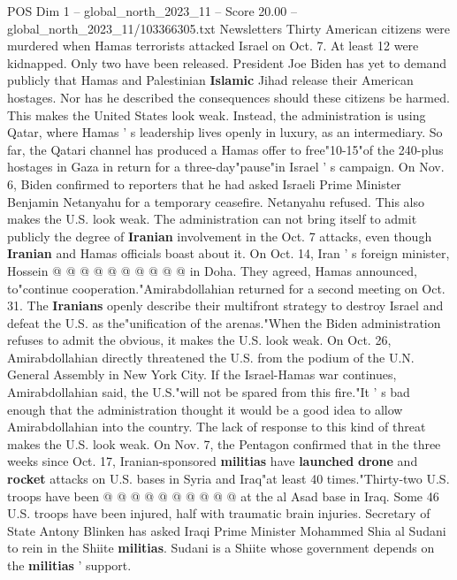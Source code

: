\begin{textsample}{POS Dim 1 – global\_north\_2023\_11 – Score 20.00 – global\_north\_2023\_11/103366305.txt}  \label{ex:f1_pos_352}
Newsletters Thirty American citizens were murdered when Hamas terrorists attacked Israel on Oct. 7.
At least 12 were kidnapped.
Only two have been released.
President Joe Biden has yet to demand publicly that Hamas and Palestinian \textbf{Islamic} Jihad release their American hostages.
Nor has he described the consequences should these citizens be harmed.
This makes the United States look weak.
Instead, the administration is using Qatar, where Hamas ' s leadership lives openly in luxury, as an intermediary.
So far, the Qatari channel has produced a Hamas offer to free"10-15"of the 240-plus hostages in Gaza in return for a three-day"pause"in Israel ' s campaign.
On Nov. 6, Biden confirmed to reporters that he had asked Israeli Prime Minister Benjamin Netanyahu for a temporary ceasefire.
Netanyahu refused.
This also makes the U.S. look weak.
The administration can not bring itself to admit publicly the degree of \textbf{Iranian} involvement in the Oct. 7 attacks, even though \textbf{Iranian} and Hamas officials boast about it.
On Oct. 14, Iran ' s foreign minister, Hossein @ @ @ @ @ @ @ @ @ @ in Doha.
They agreed, Hamas announced, to"continue cooperation."Amirabdollahian returned for a second meeting on Oct. 31.
The \textbf{Iranians} openly describe their multifront strategy to destroy Israel and defeat the U.S. as the"unification of the arenas."When the Biden administration refuses to admit the obvious, it makes the U.S. look weak.
On Oct. 26, Amirabdollahian directly threatened the U.S. from the podium of the U.N.
General Assembly in New York City.
If the Israel-Hamas war continues, Amirabdollahian said, the U.S."will not be spared from this fire."It ' s bad enough that the administration thought it would be a good idea to allow Amirabdollahian into the country.
The lack of response to this kind of threat makes the U.S. look weak.
On Nov. 7, the Pentagon confirmed that in the three weeks since Oct. 17, Iranian-sponsored \textbf{militias} have \textbf{launched} \textbf{drone} and \textbf{rocket} attacks on U.S. bases in Syria and Iraq"at least 40 times."Thirty-two U.S. troops have been @ @ @ @ @ @ @ @ @ @ at the al Asad base in Iraq.
Some 46 U.S. troops have been injured, half with traumatic brain injuries.
Secretary of State Antony Blinken has asked Iraqi Prime Minister Mohammed Shia al Sudani to rein in the Shiite \textbf{militias}.
Sudani is a Shiite whose government depends on the \textbf{militias} ' support.

\end{textsample}
